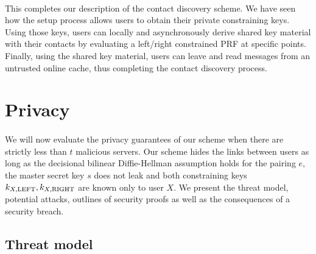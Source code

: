 	
	\paragraph{} This completes our description of the contact discovery scheme. We have seen how the setup process allows users to obtain their private constraining keys. Using those keys, users can locally and asynchronously derive shared key material with their contacts by evaluating a left/right constrained PRF at specific points. Finally, using the shared key material, users can leave and read messages from an untrusted online cache, thus completing the contact discovery process.


		


\section{Privacy}
\label{sec:security}


\paragraph{} We will now evaluate the privacy guarantees of our scheme when there are strictly less than $t$ malicious servers. Our scheme hides the links between users as long as the decisional bilinear Diffie-Hellman assumption holds for the pairing $e$, the master secret key $s$ does not leak and both constraining keys $k_{X,\mathrm{LEFT}}, k_{X,\mathrm{RIGHT}}$ are known only to user $X$. We present the threat model, potential attacks, outlines of security proofs as well as the consequences of a security breach.



	\subsection{Threat model}
